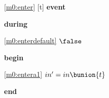 \noindent \ref{m0:enter} [t] \textbf{event}
\begin{block}
\item \textbf{during}
\begin{block}
\item[ \eqref{m0:enterdefault} ]$\false$ %
\end{block}
\item \textbf{begin}
\begin{block}
\item[ \eqref{m0:entera1} ]$in' = in \bunion \{ t \} $ %
\end{block}
\item \textbf{end} \\
\end{block}
